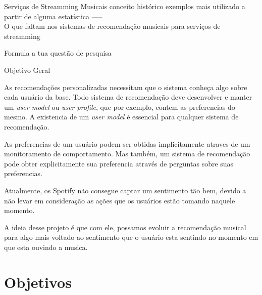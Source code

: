 \documentclass{article}
\begin{document}


Serviços de Streamming Musicais
  conceito
  histórico
  exemplos
  mais utilizado a partir de alguma estatística
----- \\







O que faltam nos sistemas de recomendação musicais para serviços de streamming


Formula a tua questão de pesquisa


Objetivo Geral


As recomendações personalizadas necessitam que o sistema conheça algo sobre cada usuário da base.
Todo sistema de recomendação deve desenvolver e manter um \textit{user model} ou \textit{user profile}, que por exemplo, contem as preferencias do mesmo.
A existencia de um \textit{user model} é essencial para qualquer sistema de recomendação. \cite{jannach2010recommender}

As preferencias de um usuário podem ser obtidas implicitamente atraves de um monitoramento de comportamento. Mas também, um sistema de recomendação pode obter explicitamente sua preferencia através de perguntas sobre suas preferencias.
\cite{jannach2010recommender}

Atualmente, os Spotify não consegue captar um sentimento tão bem, devido a não levar em consideração as ações que os usuários estão tomando naquele momento. 

A ideia desse projeto é que com ele, possamos evoluir a recomendação musical para algo mais voltado ao sentimento que o usuário esta sentindo no momento em que esta ouvindo a musica.

\newpage

\section{Objetivos}
\end{document}
